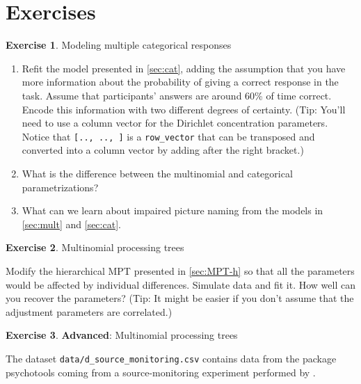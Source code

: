 \documentclass[12pt,]{krantz}
\providecommand{\tightlist}{%
  \setlength{\itemsep}{0pt}\setlength{\parskip}{0pt}}
\theoremstyle{definition}
\theoremstyle{definition}
\theoremstyle{definition}
\newtheorem{exercise}{Exercise}[chapter]
\theoremstyle{remark}
\begin{document}
\hypertarget{exercises-9}{%
\section{Exercises}\label{exercises-9}}

\begin{exercise}
\protect\hypertarget{exr:mult}{}{\label{exr:mult} }Modeling multiple categorical responses
\end{exercise}

\begin{enumerate}
\def\labelenumi{\alph{enumi}.}
\tightlist
\item
  Refit the model presented in \ref{sec:cat}, adding the assumption that you have more information about the probability of giving a correct response in the task. Assume that participants' answers are around 60\% of time correct. Encode this information with two different degrees of certainty. (Tip: You'll need to use a column vector for the Dirichlet concentration parameters. Notice that \texttt{{[}..,\ ..,\ {]}} is a \texttt{row\_vector} that can be transposed and converted into a column vector by adding \texttt{\textquotesingle{}} after the right bracket.)
\item
  What is the difference between the multinomial and categorical parametrizations?
\item
  What can we learn about impaired picture naming from the models in \ref{sec:mult} and \ref{sec:cat}.
\end{enumerate}

\begin{exercise}
\protect\hypertarget{exr:mpt}{}{\label{exr:mpt} }Multinomial processing trees
\end{exercise}

Modify the hierarchical MPT presented in \ref{sec:MPT-h} so that all the parameters would be affected by individual differences. Simulate data and fit it. How well can you recover the parameters? (Tip: It might be easier if you don't assume that the adjustment parameters are correlated.)

\begin{exercise}
\protect\hypertarget{exr:mpt-adv}{}{\label{exr:mpt-adv} }\textbf{Advanced}: Multinomial processing trees
\end{exercise}

The dataset \texttt{data/d\_source\_monitoring.csv} contains data from the package psychotools coming from a source-monitoring experiment \citep{batchelder1990multinomial} performed by \citet{wickelmaier2018using}.
\end{document}

